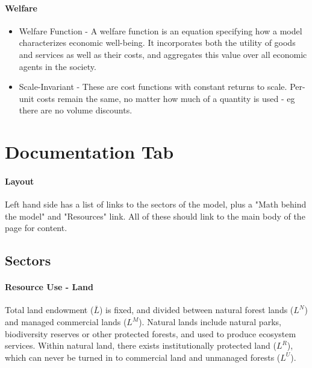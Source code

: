 \documentclass[10pt]{article}
\begin{document}
\paragraph{Welfare}
\begin{itemize}
\item Welfare Function - A welfare function is an equation specifying how a model characterizes economic well-being. It incorporates both the utility of goods and services as well as their costs, and aggregates this value over all economic agents in the society. 
\end{itemize}
\begin{itemize}
\item Scale-Invariant - These are cost functions with constant returns to scale. Per-unit costs remain the same, no matter how much of a quantity is used - eg there are no volume discounts. 
\end{itemize}


\section{Documentation Tab}
\paragraph{Layout}
Left hand side has a list of links to the sectors of the model, plus a "Math behind the model" and "Resources" link. All of these should link to the main body of the page for content. 

\subsection{Sectors}

\paragraph{Resource Use - Land}

Total land endowment ($\bar{L}$) is fixed, and divided between natural forest lands ($L^N$) and managed commercial lands ($L^M$). Natural lands include natural parks, biodiversity reserves or other protected forests, and used to produce ecosystem services. Within natural land, there exists institutionally protected land ($L^R$), which can never be turned in to commercial land and unmanaged forests ($L^U$). 
\end{document}

